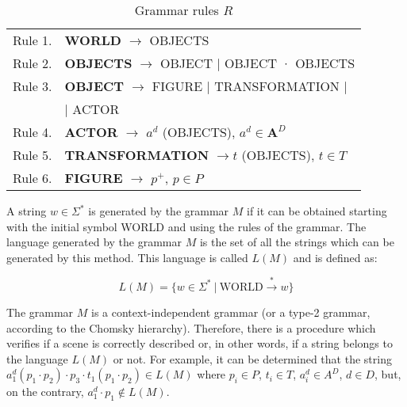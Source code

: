 \documentclass[10pt,journal,letterpaper,compsoc]{IEEEtran}
\begin{document}
\begin{table}[h]
\caption{Grammar rules $R$}
\label{tab:rules}
\begin{center}
\begin{tabular}{|ll|}
    \hline

    Rule 1. & \textbf{WORLD} $\rightarrow$ OBJECTS \\

    Rule 2. & \textbf{OBJECTS} $\rightarrow$ OBJECT $|$ OBJECT · OBJECTS \\

    Rule 3. & \textbf{OBJECT} $\rightarrow$ FIGURE $|$ TRANSFORMATION $|$ \\
            & $|$ ACTOR \\

    Rule 4. & \textbf{ACTOR} $\rightarrow$ $a^d$ (OBJECTS), $a^d \in \textbf{A}^D$ \\

    Rule 5. & \textbf{TRANSFORMATION} $\rightarrow t$ (OBJECTS), $t \in T$ \\

    Rule 6. & \textbf{FIGURE} $\rightarrow$ $p^+$, $p \in P$ \\

    \hline
\end{tabular}
\end{center}
\end{table}



A string $w \in \Sigma^*$ is generated by the grammar $M$ if it can be
obtained starting with the initial symbol WORLD and using the rules of the
grammar. The language generated by the grammar $M$ is the set of all the strings
which can be generated by this method. This language is called $L(M)$ and is
defined as:


\begin{equation}
 L(M) = \lbrace w \in \Sigma^* \ | \ \text{WORLD} \stackrel{*}{\rightarrow} w
\rbrace
\end{equation}


The grammar $M$ is a context-independent grammar (or a type-2 grammar, according to the Chomsky
hierarchy). Therefore, there is a procedure which verifies if a scene is correctly described or, in
other words, if a string belongs to the language $L(M)$ or not. For example, it can be determined
that the string $a_1^d ( p_1 \cdot p_2) \cdot p_3 \cdot t_1 ( p_1 \cdot p_2 ) \in L(M)$ where $p_i
\in P$, $t_i \in T$, $a_i^d \in A^D$, $d \in D$, but, on the contrary, $a_1^d \cdot p_1 \notin
L(M)$.
\end{document}
